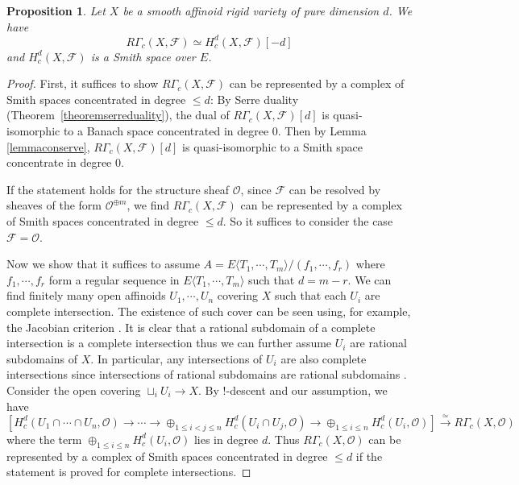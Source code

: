 \documentclass[a4paper,10pt]{amsart}
\theoremstyle{remark}
\theoremstyle{definition}
\theoremstyle{plain}
\newtheorem{proposition}[theorem]{Proposition}
\numberwithin{equation}{section}
\newcommand{\calF}{{\mathcal F}}
\newcommand{\calO}{{\mathcal O}}
\begin{document}
\begin{proposition}\label{propcompactsmith}
	Let $X$ be a smooth affinoid rigid variety of pure dimension $d$. We have \[R\Gamma_c(X,\calF)\simeq H^d_c(X,\calF)[-d]\] 
	and $H^d_c(X,\calF)$ is a Smith space over $E$.
\end{proposition}

\begin{proof}
  First, it suffices to show $R\Gamma_c(X,\calF)$ can be represented by a complex of Smith spaces concentrated in degree $\leq d$: By Serre duality (Theorem~\ref{theoremserreduality}), the dual of $R\Gamma_c(X,\calF)[d]$ is quasi-isomorphic to a Banach space concentrated in degree $0$. Then by Lemma \ref{lemmaconserve}, $R\Gamma_c(X,\calF)[d]$ is quasi-isomorphic to a Smith space concentrate in degree $0$.
  
   If the statement holds for the structure sheaf $\calO$, since $\calF$ can be resolved by sheaves of the form $\calO^{\oplus m}$, we find $R\Gamma_c(X,\calF)$ can be represented by a complex of Smith spaces concentrated in degree $\leq d$. So it suffices to consider the case $\calF=\calO$.
  
  
	Now we show that it suffices to assume $A=E\langle T_1,\cdots,T_m\rangle/(f_1,\cdots,f_r)$ where $f_1,\cdots,f_r$ form a regular sequence in $E\langle T_1,\cdots,T_m\rangle$ such that $d=m-r$. We can find finitely many open affinoids $U_1,\cdots,U_n$ covering $X$ such that each $U_i$ are complete intersection. The existence of such cover can be seen using, for example, the Jacobian criterion \cite[Prop.~1.7.1, Cor.~1.6.10]{huber1996etale}. It is clear that a rational subdomain of a complete intersection is a complete intersection thus we can further assume $U_i$ are rational subdomains of $X$. In particular, any intersections of $U_i$ are also complete intersections since intersections of rational subdomains are rational subdomains \cite[\S~3.3, Prop.~14]{bosch2014formal}. Consider the open covering $\sqcup_i U_i\to X$. By $!$-descent and our assumption, we have
	$$[H^d_c(U_1\cap \cdots \cap U_n,\calO)\to \cdots \to \oplus_{1\leq i<j\leq n} H^d_c(U_i\cap U_j,\calO)\to \oplus_{1\leq i\leq n} H^d_c(U_i,\calO)] \stackrel{\simeq}\longrightarrow R\Gamma_c(X,\calO)$$
	where the term $\oplus_{1\leq i\leq n} H^d_c(U_i,\calO)$ lies in degree $d$. Thus $R\Gamma_c(X,\calO)$ can be represented by a complex of Smith spaces concentrated in degree $\leq d$ if the statement is proved for complete intersections.
	

\end{proof}
\end{document}

